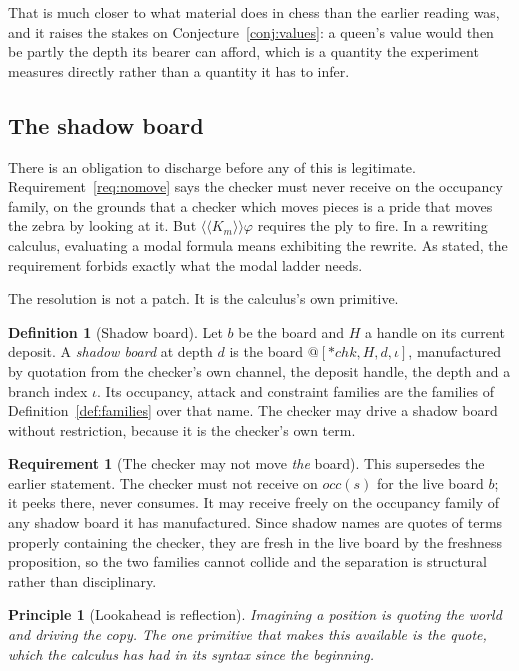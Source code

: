 \documentclass[11pt,a4paper]{article}
\makeatletter
\theoremstyle{plain}
\newtheorem{principle}[theorem]{Principle}
\theoremstyle{definition}
\newtheorem{definition}[theorem]{Definition}
\newtheorem{requirement}[theorem]{Requirement}
\theoremstyle{remark}
\newcommand{\qt}[1]{\ensuremath{@#1}}
\newcommand{\KKmod}[1]{\langle\!\langle K_{#1}\rangle\!\rangle}
\makeatother
\begin{document}
That is much closer to what material does in chess than the earlier reading was,
and it raises the stakes on Conjecture~\ref{conj:values}: a queen's value would
then be partly the depth its bearer can afford, which is a quantity the
experiment measures directly rather than a quantity it has to infer.

\subsection{The shadow board}
\label{sec:shadow}

There is an obligation to discharge before any of this is legitimate.
Requirement~\ref{req:nomove} says the checker must never receive on the
occupancy family, on the grounds that a checker which moves pieces is a pride
that moves the zebra by looking at it. But $\KKmod{m}\varphi$ requires the ply
to fire. In a rewriting calculus, evaluating a modal formula means exhibiting
the rewrite. As stated, the requirement forbids exactly what the modal ladder
needs.

The resolution is not a patch. It is the calculus's own primitive.

\begin{definition}[Shadow board]
\label{def:shadow}
Let $b$ be the board and $H$ a handle on its current deposit. A \emph{shadow
board} at depth $d$ is the board $\qt{[*\mathit{chk},H,d,\iota]}$, manufactured
by quotation from the checker's own channel, the deposit handle, the depth and a
branch index $\iota$. Its occupancy, attack and constraint families are the
families of Definition~\ref{def:families} over that name. The checker may drive
a shadow board without restriction, because it is the checker's own term.
\end{definition}

\begin{requirement}[The checker may not move \emph{the} board]
\label{req:nomove2}
This supersedes the earlier statement. The checker must not receive on
$\mathit{occ}(s)$ for the live board $b$; it peeks there, never consumes. It may
receive freely on the occupancy family of any shadow board it has manufactured.
Since shadow names are quotes of terms properly containing the checker, they are
fresh in the live board by the freshness proposition, so the two families cannot
collide and the separation is structural rather than disciplinary.
\end{requirement}

\begin{principle}[Lookahead is reflection]
\label{prin:lookref}
Imagining a position is quoting the world and driving the copy. The one
primitive that makes this available is the quote, which the calculus has had in
its syntax since the beginning.
\end{principle}
\end{document}
